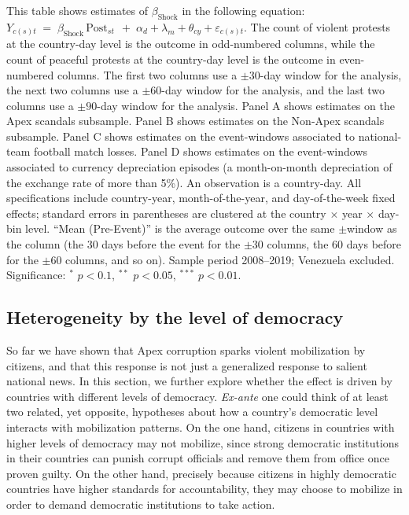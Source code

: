 \documentclass[11pt]{article}
\let\mathbetasym\beta
\renewcommand{\beta}{\ensuremath{\mathbetasym}}
\begin{document}
\begin{table}[htb!]
    \caption{The effect on violent mobilization is unique to Apex corruption, not generalized across national salient news}
    \label{tab:uniquetocorruption}
    \begin{center}
        \scriptsize{}
    \end{center}
    \footnotesize{This table shows estimates of $\beta_{\text{Shock}}$ in the following equation: $Y_{c(s)t} \;=\; \beta_{\text{Shock}}\, \mathrm{Post}_{st}\, \;+\; \alpha_d + \lambda_m + \theta_{cy} + \varepsilon_{c(s)t}$. The count of violent protests at the country-day level is the outcome in odd-numbered columns, while the count of peaceful protests at the country-day level is the outcome in even-numbered columns. The first two columns use a $\pm30$-day window for the analysis, the next two columns use a $\pm60$-day window for the analysis, and the last two columns use a $\pm90$-day window for the analysis. Panel A shows estimates on the Apex scandals subsample. Panel B shows estimates on the Non-Apex scandals subsample. Panel C shows estimates on the event-windows associated to national-team football match losses. Panel D shows estimates on the event-windows associated to currency depreciation episodes (a month-on-month depreciation of the exchange rate of more than 5\%). An observation is a country-day. All specifications include country-year, month-of-the-year, and day-of-the-week fixed effects; standard errors in parentheses are clustered at the country $\times$ year $\times$ day-bin level. ``Mean (Pre-Event)'' is the average outcome over the same $\pm$window as the column (the 30 days before the event for the $\pm$30 columns, the 60 days before for the $\pm$60 columns, and so on). Sample period 2008--2019; Venezuela excluded. Significance: $^{*}$ $p<0.1$, $^{**}$ $p<0.05$, $^{***}$ $p<0.01$.}
\end{table}

\subsection{Heterogeneity by the level of democracy}

So far we have shown that Apex corruption sparks violent mobilization by citizens, and that this response is not just a generalized response to salient national news. In this section, we further explore whether the effect is driven by countries with different levels of democracy. \textit{Ex-ante} one could think of at least two related, yet opposite, hypotheses about how a country's democratic level interacts with mobilization patterns. On the one hand, citizens in countries with higher levels of democracy may not mobilize, since strong democratic institutions in their countries can punish corrupt officials and remove them from office once proven guilty. On the other hand, precisely because citizens in highly democratic countries have higher standards for accountability, they may choose to mobilize in order to demand democratic institutions to take action. 
\end{document}

